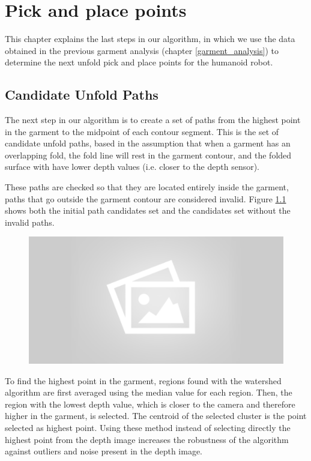 \chapter{Pick and place points}
\label{pick_and_place}
This chapter explains the last steps in our algorithm, in which we use the data obtained in the previous garment analysis (chapter \ref{garment_analysis}) to determine the next unfold pick and place points for the humanoid robot.

\section{Candidate Unfold Paths}
\label{unfold_paths}

The next step in our algorithm is to create a set of paths from the highest point in the garment to the midpoint of each contour segment. This is the set of candidate unfold paths, based in the assumption that when a garment has an overlapping fold, the fold line will rest in the garment contour, and the folded surface with have lower depth values (i.e. closer to the depth sensor).

These paths are checked so that they are located entirely inside the garment, paths that go outside the garment contour are considered invalid. Figure \ref{fig:candidate_paths} shows both the initial path candidates set and the candidates set without the invalid paths.

\begin{figure}[thpb]
    \centering
    \includegraphics[width=0.7
    \textwidth]{figures/placeholder2.png}
    \caption{}
    \label{fig:candidate_paths}
\end{figure}


To find the highest point in the garment, regions found with the watershed algorithm are first averaged using the median value for each region. Then, the region with the lowest depth value, which is closer to the camera and therefore higher in the garment, is selected. The centroid of the selected cluster is the point selected as highest point. Using these method instead of selecting directly the highest point from the depth image increases the robustness of the algorithm against outliers and noise present in the depth image.



